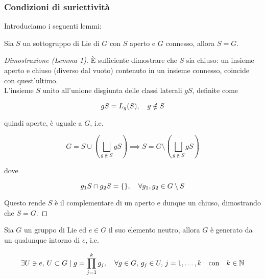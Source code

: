 \subsubsection{Condizioni di suriettività}

Introduciamo i seguenti lemmi:

\begin{lemma}[1]
	Sia $ S $ un sottogruppo di Lie di $ G $ con $ S $ aperto e $ G $ connesso, allora $ S = G $.
\end{lemma}

\begin{proof}[Dimostrazione (Lemma 1)]
	\`{E} sufficiente dimostrare che $ S $ sia chiuso: un insieme aperto e chiuso (diverso dal vuoto) contenuto in un insieme connesso, coincide con quest'ultimo.\\
	L'insieme $ S $ unito all'unione disgiunta delle classi laterali $ g S $, definite come
	
	\begin{equation}
		g S = L_{g}(S) \qcomma g \notin S
	\end{equation}
	
	quindi aperte, è uguale a $ G $, i.e.
	
	\begin{equation}
		G = S \cup \left( \bigsqcup_{g \notin S} g S \right) \implies S = G \setminus \left( \bigsqcup_{g \notin S} g S \right)
	\end{equation}
	
	dove
	
	\begin{equation}
		g_{1} S \cap g_{2} S = \{\} \qcomma \forall g_{1},g_{2} \in G \setminus S
	\end{equation}
	
	Questo rende $ S $ è il complementare di un aperto e dunque un chiuso, dimostrando che $ S = G $.
\end{proof}

\begin{lemma}[2]
	Sia $ G $ un gruppo di Lie ed $ e \in G $ il suo elemento neutro, allora $ G $ è generato da un qualunque intorno di $ e $, i.e.
	
	\begin{equation}
		\exists U \ni e, \, U \subset G \mid g = \prod_{j=1}^{k} g_{j} \qcomma \forall g \in G, \, g_{j} \in U, \, j=1,\dots,k \qq{con} k \in \N
	\end{equation}
\end{lemma}

